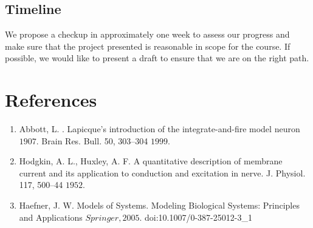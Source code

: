 \documentclass[11pt]{article}
\begin{document}
\subsection{Timeline} %
\label{sub:timeline}

We propose a checkup in approximately one week to assess our progress and make sure that the project presented is reasonable in scope for the course. If possible, we would like to present a draft to ensure that we are on the right path. 




\newpage

\section{References} %
\label{sec:references}

\begin{enumerate}
	\item Abbott, L. . Lapicque’s introduction of the integrate-and-fire model neuron \(1907\). Brain Res. Bull. 50, 303–304 \(1999\).
	\item Hodgkin, A. L., Huxley, A. F. A quantitative description of membrane current and its application to conduction and excitation in nerve. J. Physiol. 117, 500–44 \(1952\).
	\item Haefner, J. W. Models of Systems. Modeling Biological Systems: Principles and Applications \(Springer, 2005\). doi:10.1007/0-387-25012-3\_1
\end{enumerate}


\end{document}
